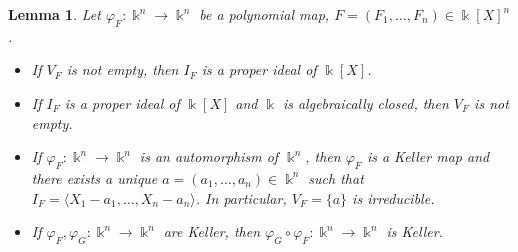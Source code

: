 \documentclass[11pt,reqno]{amsart}
\newtheorem{lemma}[theorem]{Lemma}
\theoremstyle{definition}
\newcommand{\mbk}{\mbox{$\Bbbk$}}
\begin{document}
\begin{lemma}\label{lem:IFmax}
Let $\varphi_F:\mbk^n\to\mbk^n$ be a polynomial map, $F=(F_1,\ldots,F_n)\in\mbk[X]^n$. 
\begin{itemize}
\item[$(1)$] If $V_F$ is not empty, then $I_F$ is a proper ideal of $\mbk[X]$.
\item[$(2)$] If $I_F$ is a proper ideal of $\mbk[X]$ and $\mbk$ is algebraically closed, then $V_F$ is not empty. 
\item[$(3)$] If $\varphi_F:\mbk^n\to\mbk^n$ is an automorphism of $\mbk^n$, then
$\varphi_F$ is a Keller map and there exists a unique 
$a=(a_1,\dots,a_n)\in\mbk^n$ such that $I_F=\langle X_1-a_1,\ldots,X_n-a_n\rangle$. 
In particular, $V_F=\{a\}$ is irreducible. 
\item[$(4)$] If $\varphi_F,\varphi_G:\mbk^n\to\mbk^n$ are Keller, then 
$\varphi_G\circ\varphi_F:\mbk^n\to\mbk^n$ is Keller. 
\end{itemize}
\end{lemma}
\end{document}
